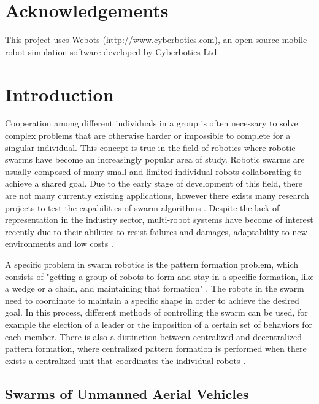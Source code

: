 \chapter*{Acknowledgements}

This project uses Webots (http://www.cyberbotics.com), an open-source mobile robot simulation software developed by Cyberbotics Ltd.

\tableofcontents

\listoffigures

\listoftables

\listofalgorithms

\chapter{Introduction}

Cooperation among different individuals in a group is often necessary to solve complex problems
that are otherwise harder or impossible to complete for a singular individual. This concept is
true in the field of robotics where robotic swarms have become an increasingly popular area of study.
Robotic swarms are usually composed of many small and limited individual robots \autocite{HO17}
collaborating to achieve a shared goal.
Due to the early
stage of development of this field, there are not many currently existing applications, however
there exists many research projects to test the capabilities of swarm algorithms \autocite{MS20}.
Despite the lack of representation in the industry sector, multi-robot systems have become of
interest recently due to their abilities to resist failures and damages, adaptability to new
environments and low costs \autocite{HO17}.

A specific problem in swarm robotics is the pattern formation problem, which consists of
"getting a group of robots to form and stay in a specific formation, like a wedge or a chain,
and maintaining that formation" \autocite{LS22}. The robots in the swarm need to coordinate
to maintain a specific shape in order to achieve the desired goal. In this process, different
methods of controlling the swarm can be used, for example the election of a leader or the 
imposition of a certain set of behaviors for each member. There is also a 
distinction between centralized and decentralized pattern formation, where centralized pattern
formation is performed when there exists a centralized unit that coordinates the individual
robots \autocite{HO17}.


\section{Swarms of Unmanned Aerial Vehicles}

